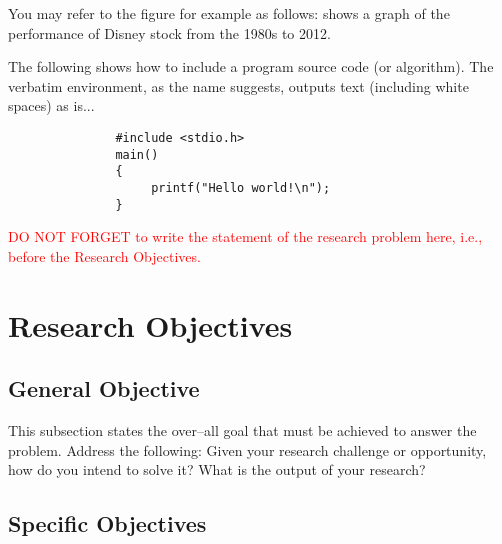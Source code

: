 You may refer to the figure for example as follows:   shows a graph of the 
performance of Disney stock from the 1980s to 2012.

The following shows how to include a program source code (or algorithm).  The verbatim environment,
as the name suggests, outputs text (including white spaces) as is...

\begin{verbatim}
               #include <stdio.h>
               main()
               {
                    printf("Hello world!\n");
               }
\end{verbatim}


\textcolor{red}{DO NOT FORGET to write the statement of the research problem here, i.e.,
before the Research Objectives.}



\section{Research Objectives}
\label{sec:researchobjectives}

\subsection{General Objective}
\label{sec:generalobjective}

This subsection states the over--all goal that must be achieved to answer the problem.
Address the following: Given your research challenge or opportunity, how do you intend 
to solve it? What is the output of your research?

%
%      
%
%
\subsection{Specific Objectives}
\label{sec:specificobjectives}

%
%

